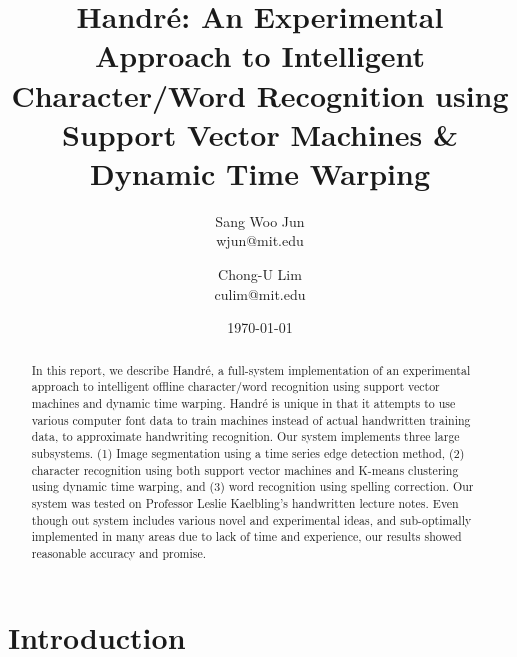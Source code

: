 \documentclass[12pt]{article}
\title{Handr\'{e}: An Experimental Approach to Intelligent Character/Word Recognition using Support Vector Machines \& Dynamic Time Warping}
\date{\today}
\author{
	Sang Woo Jun \\ 
	wjun@mit.edu \\ 
  \and
  Chong-U Lim\\
  culim@mit.edu
}
\begin{document}
\maketitle

\begin{abstract}

	In this report, we describe Handr\'{e}, a full-system implementation of an experimental approach to intelligent offline character/word recognition using support vector machines and dynamic time warping. Handr\'{e} is unique in that it attempts to use various computer font data to train machines instead of actual handwritten training data, to approximate handwriting recognition. Our system implements three large subsystems. (1) Image segmentation using a time series edge detection method, (2) character recognition using both support vector machines and K-means clustering using dynamic time warping, and (3) word recognition using spelling correction. Our system was tested on Professor Leslie Kaelbling's handwritten lecture notes. Even though out system includes various novel and experimental ideas, and sub-optimally implemented in many areas due to lack of time and experience, our results showed reasonable accuracy and promise.
	
\end{abstract}

\newpage
\tableofcontents
\newpage
\section{Introduction}
\end{document}
